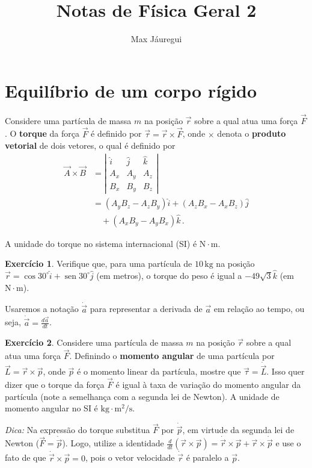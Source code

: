 \documentclass[papersize=a4,DIV=calc,twocolumn=on]{scrartcl}
\title{Notas de Física Geral 2}
\author{Max Jáuregui}
\theoremstyle{definition}
\newtheorem{ex}{Exercício}[section]
\DeclareMathOperator{\sen}{sen}
\begin{document}
\maketitle
\tableofcontents

\section{Equilíbrio de um corpo rígido}

Considere uma partícula de massa $m$ na posição $\vec r$ sobre a qual
atua uma força $\vec F$. O \textbf{torque} da força $\vec F$ é
definido por $\vec\tau=\vec r\times\vec F$, onde $\times$ denota o
\textbf{produto vetorial} de dois vetores, o qual é definido por
\begin{equation*}
  \begin{split}
    \vec A\times\vec B&= \left|
      \begin{array}{ccc}
        \hat i&\hat j&\hat k\\
        A_x&A_y&A_z\\
        B_x&B_y&B_z
      \end{array}
    \right|\\
    &=(A_yB_z-A_zB_y)\hat i+(A_zB_x-A_xB_z)\hat j\\
    &\quad+(A_xB_y-A_yB_x)\hat k\,.
  \end{split}
\end{equation*}

A unidade do torque no sistema internacional (SI) é
$\mathrm{N}\cdot\mathrm{m}$.

\begin{ex}
  Verifique que, para uma partícula de $10\,\mathrm{kg}$ na posição
  $\vec r=\cos 30^\circ\hat i+\sen 30^\circ\hat j$ (em metros), o
  torque do peso é igual a $-49\sqrt{3}\hat k$ (em
  $\mathrm{N}\cdot \mathrm{m}$).
\end{ex}

Usaremos a notação $\dot{\vec a}$ para representar a derivada de
$\vec a$ em relação ao tempo, ou seja,
$\dot{\vec a}=\frac{d\vec a}{dt}$.

\begin{ex}
  Considere uma partícula de massa $m$ na posição $\vec r$ sobre a
  qual atua uma força $\vec F$. Definindo o \textbf{momento angular}
  de uma partícula por $\vec L=\vec r\times\vec p$, onde $\vec p$ é o
  momento linear da partícula, mostre que $\vec\tau=\dot{\vec
    L}$. Isso quer dizer que o torque da força $\vec F$ é igual à taxa
  de variação do momento angular da partícula (note a semelhança com a
  segunda lei de Newton). A unidade de momento angular no SI é
  $\mathrm{kg}\cdot\mathrm{m^2/s}$.

  \noindent\textit{Dica:} Na expressão do torque substitua $\vec F$ por
  $\dot{\vec p}$, em virtude da segunda lei de Newton
  ($\vec F=\dot{\vec p}$). Logo, utilize a identidade
  $\frac{d}{dt}(\vec r\times\vec p)=\dot{\vec r}\times\vec p+\vec
  r\times\dot{\vec p}$ e use o fato de que
  $\dot{\vec r}\times\vec p=0$, pois o vetor velocidade $\dot{\vec r}$
  é paralelo a $\vec p$.
\end{ex}
\end{document}
